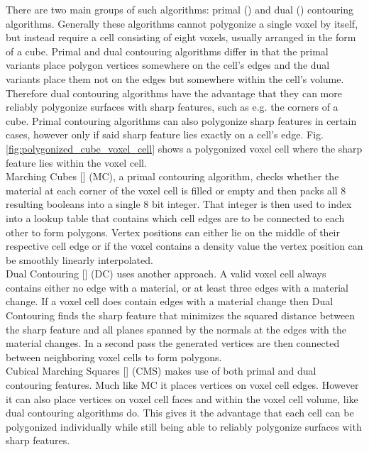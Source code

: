 There are two main groups of such algorithms: primal () and dual () contouring algorithms.
Generally these algorithms cannot polygonize a single voxel by itself, but instead require a cell consisting of eight voxels, usually arranged in the form
of a cube. Primal and dual contouring algorithms differ in that the primal variants place polygon vertices somewhere on the cell's edges and the dual variants
place them not on the edges but somewhere within the cell's volume. Therefore dual contouring algorithms have the advantage that they can more reliably polygonize
surfaces with sharp features, such as e.g. the corners of a cube. Primal contouring algorithms can also polygonize sharp features in certain cases, however only
if said sharp feature lies exactly on a cell's edge. Fig. \ref{fig:polygonized_cube_voxel_cell} shows a polygonized voxel cell where the sharp feature lies within
the voxel cell.\\
Marching Cubes [] (MC), a primal contouring algorithm, checks whether the material at each corner of the voxel cell is filled or empty and then 
packs all 8 resulting booleans into a single 8 bit integer. That integer is then used to index into a lookup table that contains which cell edges are to be connected to
each other to form polygons. Vertex positions can either lie on the middle of their respective cell edge or if the voxel contains a density value the vertex position
can be smoothly linearly interpolated.\\
Dual Contouring [] (DC) uses another approach. A valid voxel cell always contains either no edge with a material, or at least three edges with a material change. If a voxel cell
does contain edges with a material change then Dual Contouring finds the sharp feature that minimizes the squared distance between the sharp feature and all planes spanned
by the normals at the edges with the material changes. In a second pass the generated vertices are then connected between neighboring voxel cells to form polygons.\\
Cubical Marching Squares [] (CMS) makes use of both primal and dual contouring features. Much like MC it places vertices on voxel cell edges. However it can also place vertices
on voxel cell faces and within the voxel cell volume, like dual contouring algorithms do. This gives it the advantage that each cell can be polygonized individually while still being able to
reliably polygonize surfaces with sharp features.

